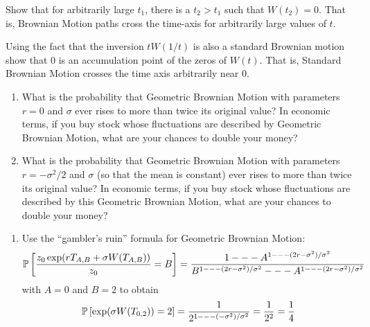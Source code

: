 \begin{solution}
\begin{solution}
\begin{solution}
\begin{solution}
\begin{solution}
\begin{solution}
\begin{solution}
\begin{solution}
\begin{solution}
\begin{solution}
{\begin{solution}
\end{solution}

\begin{problem}
 Show that for arbitrarily large $t_1$, there is a $t_2>t_1$ 
  such that $W(t_2)=0$. That is, Brownian Motion paths cross the time-axis for 
  arbitrarily large values of $t$.
\end{problem} 
\begin{solution} 

\end{solution}

\begin{problem}
 Using the fact that the inversion $t W(1/t)$ is also a standard 
  Brownian motion show that $0$ is an accumulation  point of the zeros of $W(t)$.  
  That is, Standard Brownian Motion crosses the time axis arbitrarily near $0$.
\end{problem} 
\begin{solution} 

\end{solution}

\begin{problem}
  \begin{enumerate}
    \item What is the probability that Geometric Brownian
    Motion with parameters $r = 0$ and $\sigma$ ever rises to more than
    twice its original value? In economic terms, if you buy
    stock whose fluctuations are described by Geometric
    Brownian Motion, what are your chances to double your
    money?

    \item What is the probability that Geometric Brownian
    Motion with parameters $r = -\sigma^2/2$ and $\sigma$ (so
    that the mean is constant) ever rises to more than twice
    its original value?  In economic terms, if you buy stock
    whose fluctuations are described by this Geometric Brownian
    Motion, what are your chances to double your money?
  \end{enumerate}
\end{problem} 
\begin{solution} 

\begin{enumerate}
  \item Use the ``gambler's ruin'' formula for Geometric
  Brownian Motion:
  $$
     \P\left[ 
          \frac{ z_0 \exp( r T_{A,B} 
                       + \sigma W(T_{A,B}))}{z_0} = B 
          \right] =
          \frac{1 --- A^{1 --- (2r-\sigma^2)/\sigma^2}}
               {B^{1 --- (2r-\sigma^2)/\sigma^2}
               --- A^{1 --- (2r-\sigma^2)/\sigma^2}}
  $$
  with $A = 0$ and $B = 2$ to obtain
  $$
     \P\left[ 
          \exp(\sigma W(T_{0,2})) = 2
          \right] =
          \frac{1}
               {2^{1 --- (-\sigma^2)/\sigma^2}} =
              \frac{1}{2^2} = \frac{1}{4}
  $$


\end{enumerate}
\end{solution}}
\end{solution}
\end{solution}
\end{solution}
\end{solution}
\end{solution}
\end{solution}
\end{solution}
\end{solution}
\end{solution}
\end{solution}
